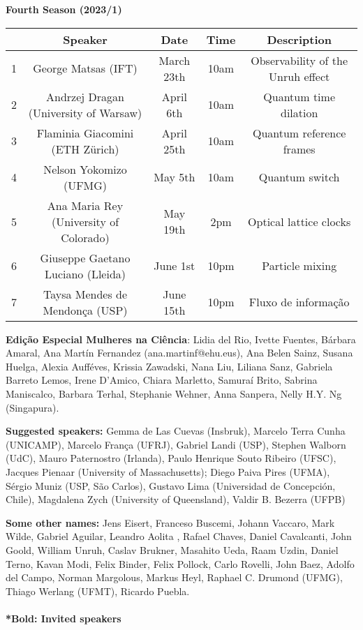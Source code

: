 \documentclass[a4paper,preprintnumbers,floatfix,superscriptaddress,pra,onecolumn,showpacs,notitlepage,longbibliography]{revtex4-1}
\begin{document}
\vspace{1cm}
\textbf{Fourth Season (2023/1)}
\begin{center}
 \begin{tabular}{| c | c | c | c | c |} 
    \hline
 & Speaker & Date & Time & Description \\ [0.5ex] 
 \hline\hline
 
1 & George Matsas (IFT) & March 23th & 10am & Observability of the Unruh effect \\ \hline
2 & Andrzej Dragan (University of Warsaw) & April 6th & 10am & Quantum time dilation \\ \hline
3 & Flaminia Giacomini (ETH Zürich) & April 25th & 10am & Quantum reference frames \\ \hline
4 & Nelson Yokomizo (UFMG) & May 5th & 10am & Quantum switch \\ \hline
5 & Ana Maria Rey (University of Colorado) & May 19th & 2pm & Optical lattice clocks \\ \hline
6 & Giuseppe Gaetano Luciano (Lleida) & June 1st & 10pm & Particle mixing \\ \hline
7 & Taysa Mendes de Mendonça (USP) & June 15th & 10pm & Fluxo de informação \\ \hline
 \end{tabular}
\end{center}
 
\vspace{1cm}
\noindent
\textbf{Edição Especial Mulheres na Ciência}: Lidia del Rio, Ivette Fuentes, Bárbara Amaral, Ana Martín Fernandez (ana.martinf@ehu.eus), Ana Belen Sainz, Susana Huelga, Alexia Aufféves, Krissia Zawadski, Nana Liu, Liliana Sanz, Gabriela Barreto Lemos, Irene D'Amico, Chiara Marletto, Samuraí Brito, Sabrina Maniscalco, Barbara Terhal, Stephanie Wehner, Anna Sanpera, Nelly H.Y. Ng (Singapura).

\vspace{1cm}
\noindent
\textbf{Suggested speakers:} Gemma de Las Cuevas (Insbruk), Marcelo Terra Cunha (UNICAMP), Marcelo França (UFRJ), Gabriel Landi (USP), Stephen Walborn (UdC), Mauro Paternostro (Irlanda), Paulo Henrique Souto Ribeiro (UFSC), Jacques Pienaar (University of Massachusetts); Diego Paiva Pires (UFMA), Sérgio Muniz (USP, São Carlos), Gustavo Lima (Universidad de Concepción, Chile), Magdalena Zych (University of Queensland), Valdir B. Bezerra (UFPB)
\vspace{1cm}

\noindent
\textbf{Some other names:} Jens Eisert, Franceso Buscemi, Johann Vaccaro, Mark Wilde, Gabriel Aguilar, Leandro Aolita , Rafael Chaves, Daniel Cavalcanti, John Goold, William Unruh, Caslav Brukner, Masahito Ueda, Raam Uzdin, Daniel Terno, Kavan Modi, Felix Binder, Felix Pollock, Carlo Rovelli, John Baez, Adolfo del Campo, Norman Margolous, Markus Heyl, Raphael C. Drumond (UFMG), Thiago Werlang (UFMT), Ricardo Puebla. 
\\
\\
\textbf{*Bold: Invited speakers}
\end{document}
